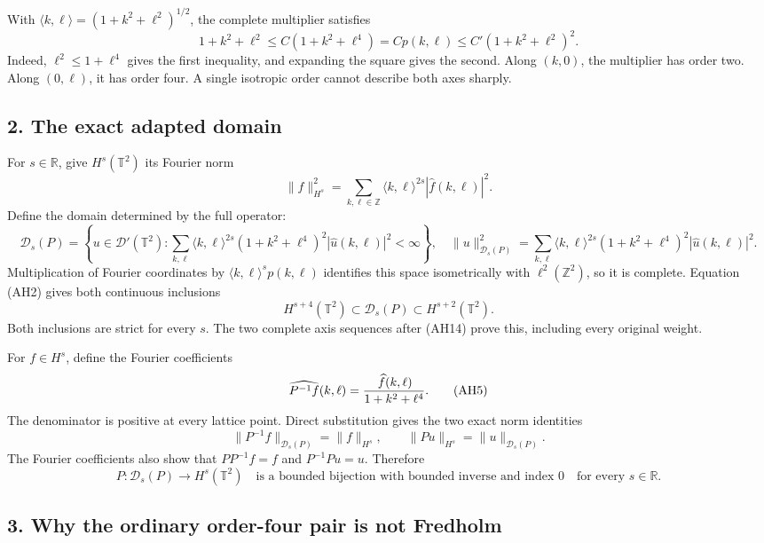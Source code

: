 \documentclass[
  11pt,
]{article}
\begin{document}
With \(\langle k,\ell\rangle=(1+k^2+\ell^2)^{1/2}\), the complete
multiplier satisfies \[
 1+k^2+\ell^2
       \le C(1+k^2+\ell^4)
       =Cp(k,\ell)
       \le C'(1+k^2+\ell^2)^2 .
 \tag{AH2}
\] Indeed, \(\ell^2\leq1+\ell^4\) gives the first inequality, and
expanding the square gives the second. Along \((k,0)\), the multiplier
has order two. Along \((0,\ell)\), it has order four. A single isotropic
order cannot describe both axes sharply.

\subsection{2. The exact adapted domain}\label{the-exact-adapted-domain}

For \(s\in\mathbb R\), give \(H^s(\mathbb T^2)\) its Fourier norm \[
 \|f\|_{H^s}^2
 =\sum_{k,\ell\in\mathbb Z}
   \langle k,\ell\rangle^{2s}|\widehat f(k,\ell)|^2 .
\] Define the domain determined by the full operator: {\footnotesize
\[
 \mathcal D_s(P)=
 \left\{u\in\mathcal D'(\mathbb T^2):
   \sum_{k,\ell}
       \langle k,\ell\rangle^{2s}
       (1+k^2+\ell^4)^2|\widehat u(k,\ell)|^2<\infty
 \right\},
 \quad
 \|u\|_{\mathcal D_s(P)}^2
   =\sum_{k,\ell}
       \langle k,\ell\rangle^{2s}
       (1+k^2+\ell^4)^2|\widehat u(k,\ell)|^2 .
 \tag{AH3}
\]
} Multiplication of Fourier coordinates by
\(\langle k,\ell\rangle^s p(k,\ell)\) identifies this space
isometrically with \(\ell^2(\mathbb Z^2)\), so it is complete. Equation
(AH2) gives both continuous inclusions \[
 H^{s+4}(\mathbb T^2)
       \subset\mathcal D_s(P)
       \subset H^{s+2}(\mathbb T^2).
 \tag{AH4}
\] Both inclusions are strict for every \(s\). The two complete axis
sequences after (AH14) prove this, including every original weight.

For \(f\in H^s\), define the Fourier coefficients \[
 \widehat{P^{-1}f}(k,\ell)
       ={\,\widehat f(k,\ell)\over1+k^2+\ell^4}.
 \tag{AH5}
\] The denominator is positive at every lattice point. Direct
substitution gives the two exact norm identities \[
 \|P^{-1}f\|_{\mathcal D_s(P)}
       =\|f\|_{H^s},\qquad
 \|Pu\|_{H^s}
       =\|u\|_{\mathcal D_s(P)} .
 \tag{AH6}
\] The Fourier coefficients also show that \(PP^{-1}f=f\) and
\(P^{-1}Pu=u\). Therefore \[
 P:\mathcal D_s(P)\longrightarrow H^s(\mathbb T^2)
       \quad\text{is a bounded bijection with bounded inverse and index }0
       \quad\text{for every }s\in\mathbb R .
 \tag{AH7}
\]

\subsection{3. Why the ordinary order-four pair is not
Fredholm}\label{why-the-ordinary-order-four-pair-is-not-fredholm}
\end{document}
